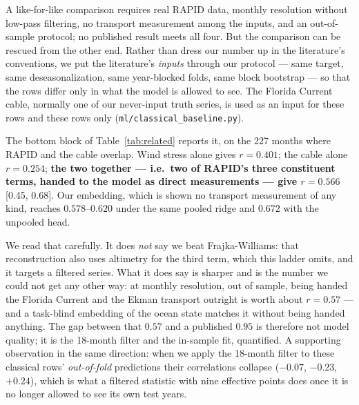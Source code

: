 \documentclass[10pt]{article}
\begin{document}
A like-for-like comparison requires real RAPID data, monthly resolution
without low-pass filtering, no transport measurement among the inputs,
and an out-of-sample protocol; no published result meets all four. But
the comparison can be rescued from the other end. Rather than dress our
number up in the literature's conventions, we put the literature's
\emph{inputs} through our protocol --- same target, same
deseasonalization, same year-blocked folds, same block bootstrap ---
so that the rows differ only in what the model is allowed to see. The
Florida Current cable, normally one of our never-input truth series, is
used as an input for these rows and these rows only
(\texttt{ml/classical\_baseline.py}).

The bottom block of Table~\ref{tab:related} reports it, on the 227
months where RAPID and the cable overlap. Wind stress alone gives
$r=0.401$; the cable alone $r=0.254$; \textbf{the two together ---
i.e.\ two of RAPID's three constituent terms, handed to the model as
direct measurements --- give $r=0.566$} [0.45, 0.68]. Our embedding,
which is shown no transport measurement of any kind, reaches
$0.578$--$0.620$ under the same pooled ridge and $0.672$ with the
unpooled head.

We read that carefully. It does \emph{not} say we beat
Frajka-Williams: that reconstruction also uses altimetry for the third
term, which this ladder omits, and it targets a filtered series. What
it does say is sharper and is the number we could not get any other
way: at monthly resolution, out of sample, being handed the Florida
Current and the Ekman transport outright is worth about $r=0.57$ ---
and a task-blind embedding of the ocean state matches it without being
handed anything. The gap between that $0.57$ and a published $0.95$ is
therefore not model quality; it is the 18-month filter and the
in-sample fit, quantified. A supporting observation in the same
direction: when we apply the 18-month filter to these classical rows'
\emph{out-of-fold} predictions their correlations collapse
($-0.07$, $-0.23$, $+0.24$), which is what a filtered statistic with
nine effective points does once it is no longer allowed to see its own
test years.
\end{document}
